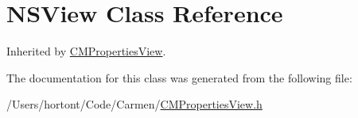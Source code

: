 \hypertarget{class_n_s_view}{
\section{NSView Class Reference}
\label{class_n_s_view}
}
Inherited by \hyperlink{interface_c_m_properties_view}{CMPropertiesView}.



The documentation for this class was generated from the following file:\begin{CompactItemize}
\item 
/Users/hortont/Code/Carmen/\hyperlink{_c_m_properties_view_8h}{CMPropertiesView.h}\end{CompactItemize}

